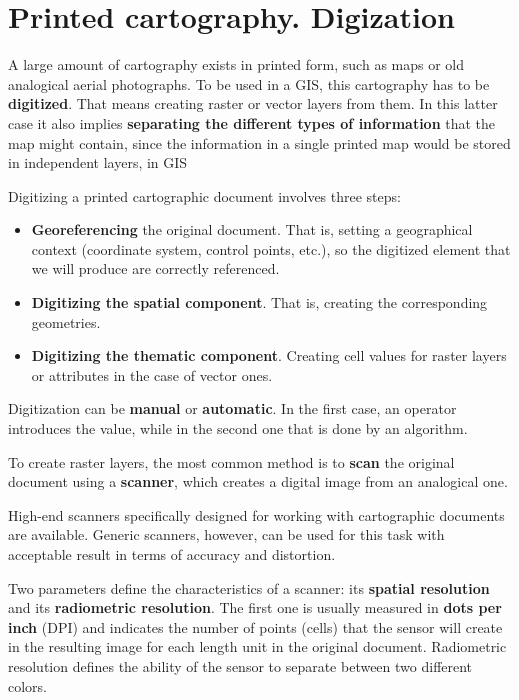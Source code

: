 \section{Printed cartography. Digization}

A large amount of cartography exists in printed form, such as maps or old analogical aerial photographs. To be used in a GIS, this cartography has to be \textbf{digitized}. That means creating raster or vector layers from them. In this latter case it also implies \textbf{separating the different types of information} that the map might contain, since the information in a single printed map would be stored in independent layers, in GIS

Digitizing a printed cartographic document involves three steps: 

\begin{itemize}
\item \textbf{Georeferencing} the original document. That is, setting a geographical context (coordinate system, control points, etc.), so the digitized element that we will produce are correctly referenced.
\item \textbf{Digitizing the spatial component}. That is, creating the corresponding geometries.
\item \textbf{Digitizing the thematic component}. Creating cell values for raster layers or attributes in the case of vector ones.
\end{itemize}

Digitization can be \textbf{manual} or \textbf{automatic}. In the first case, an operator introduces the value, while in the second one that is done by an algorithm.

To create raster layers, the most common method is to \textbf{scan} the original document using a \textbf{scanner}, which creates a digital image from an analogical one.

High-end scanners specifically designed for working with cartographic documents are available. Generic scanners, however, can be used for this task with acceptable result in terms of accuracy and distortion. 

Two parameters define the characteristics of a scanner: its \textbf{spatial resolution} and its \textbf{radiometric resolution}. The first one is usually measured in \textbf{dots per inch} (DPI) and indicates the number of points (cells) that the sensor will create in the resulting image for each length unit in the original document. Radiometric resolution defines the ability of the sensor to separate between two different colors.

